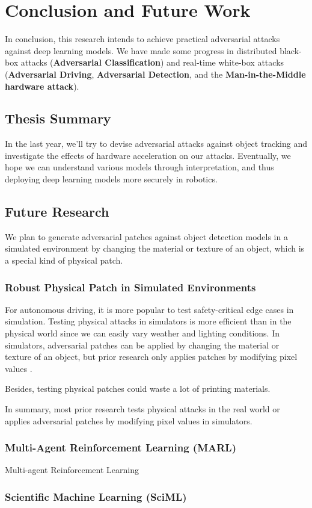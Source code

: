 \chapter{Conclusion and Future Work}
\label{chpt:conclusion}

In conclusion, this research intends to achieve practical adversarial attacks against deep learning models. We have made some progress in distributed black-box attacks (\textbf{Adversarial Classification}) and real-time white-box attacks (\textbf{Adversarial Driving}, \textbf{Adversarial Detection}, and the \textbf{Man-in-the-Middle hardware attack}).

\section{Thesis Summary}

In the last year, we'll try to devise adversarial attacks against object tracking and investigate the effects of hardware acceleration on our attacks. Eventually, we hope we can understand various models through interpretation, and thus deploying deep learning models more securely in robotics.

\clearpage

\section{Future Research}

We plan to generate adversarial patches against object detection models in a simulated environment by changing the material or texture of an object, which is a special kind of physical patch.
   
\subsection{Robust Physical Patch in Simulated Environments}

For autonomous driving, it is more popular to test safety-critical edge cases in simulation. Testing physical attacks in simulators is more efficient than in the physical world since we can easily vary weather and lighting conditions. In simulators, adversarial patches can be applied by changing the material or texture of an object, but prior research only applies patches by modifying pixel values \cite{mathov2021enhancing} \cite{nesti2022evaluating} \cite{rossolini2022realworld}.

Besides, testing physical patches could waste a lot of printing materials.

In summary, most prior research tests physical attacks in the real world or applies adversarial patches by modifying pixel values in simulators.

\subsection{Multi-Agent Reinforcement Learning (MARL)}

Multi-agent Reinforcement Learning


\subsection{Scientific Machine Learning (SciML)}

